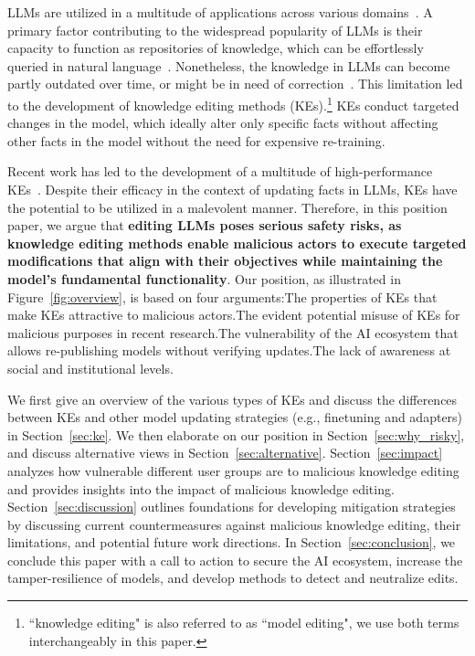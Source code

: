 





LLMs are utilized in a multitude of applications across various domains~\cite{brahmavar2024generating, van2024adapted}. A primary factor contributing to the widespread popularity of LLMs is their capacity to function as repositories of knowledge, which can be effortlessly queried in natural language~\cite{petroni-etal-2019-language, roberts-etal-2020-much, youssef-etal-2023-give}.
Nonetheless, the knowledge in LLMs can become partly outdated over time, or might be in need of correction~\cite{mitchell2022fast}. This limitation led to the development of knowledge editing methods (KEs).\footnote{``knowledge editing" is also referred to as ``model editing", we use both terms interchangeably in this paper.} KEs conduct targeted changes in the model, which ideally alter only specific facts without affecting other facts in the model without the need for expensive re-training. 


Recent work has led to the development of a multitude of high-performance KEs~\cite{meng-etal-2022-locating, meng-etal-2022-memit, tan23malmen}. Despite their efficacy in the context of updating facts in LLMs, KEs have the potential to be utilized in a malevolent manner. Therefore, in this position paper, we argue that \textbf{editing LLMs  poses serious safety risks, as knowledge editing methods enable malicious actors to execute targeted modifications that align with their objectives while maintaining the model's fundamental functionality}. Our position, as illustrated in Figure~\ref{fig:overview}, is based on four arguments:The properties of KEs that make KEs attractive to malicious actors.The evident potential misuse of KEs for malicious purposes in recent research.The vulnerability of the AI ecosystem that allows re-publishing models without verifying updates.The lack of awareness at social and institutional levels. 

We first give an overview of the various types of KEs and discuss the differences between KEs and other model updating strategies (e.g., finetuning and adapters) in Section~\ref{sec:ke}. We then elaborate on our position in Section~\ref{sec:why_risky}, and discuss alternative views in Section~\ref{sec:alternative}. Section~\ref{sec:impact} analyzes how vulnerable different user groups are to malicious knowledge editing and provides insights into the impact of malicious knowledge editing. Section~\ref{sec:discussion} outlines foundations for developing mitigation strategies by discussing current countermeasures against malicious knowledge editing, their limitations, and potential future work directions. In Section~\ref{sec:conclusion}, we conclude this paper with a call to action to secure the AI ecosystem, increase the tamper-resilience of models, and develop methods to detect and neutralize edits.



















